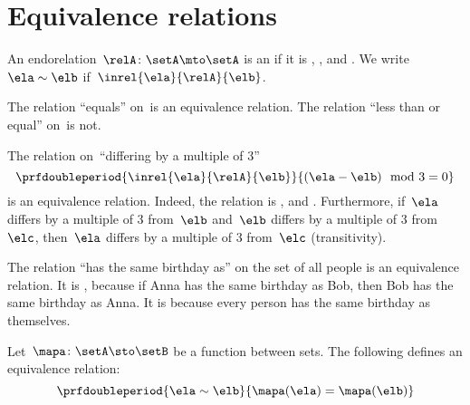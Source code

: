 
\section{Equivalence relations}

\begin{ctdefinition}
    \label{def:equivalence-relation}
    An endorelation~$\relA\colon \setA\mto \setA$ is an \emph{} if it is , , and .
    We write~$\ela\sim \elb$ if~$\inrel{\ela}{\relA}{\elb}$.
\end{ctdefinition}

\begin{example}
    The relation ``equals'' on~\natnumbers  is an equivalence relation.
    The relation ``less than or equal'' on~\natnumbers  is not.
\end{example}

\begin{example}
    The relation on~\natnumbers  ``differing by a multiple of 3''
    \begin{equation}
        \prfdoubleperiod{
            \inrel{\ela}{\relA}{\elb}
        }{
            (\ela-\elb) \mod 3 = 0
        }
    \end{equation}
    is an equivalence relation.
    Indeed, the relation is , and .
    Furthermore, if~$\ela$ differs by a multiple of 3 from~$\elb$ and~$\elb$ differs by a multiple of 3 from~$\elc$, then~$\ela$ differs by a multiple of 3 from~$\elc$ (transitivity).
\end{example}

\begin{example}
    The relation ``has the same birthday as'' on the set of all people is an equivalence relation.
    It is , because if Anna has the same birthday as Bob, then Bob has the same birthday as Anna.
    It is  because every person has the same birthday as themselves.
\end{example}

\begin{example}
    Let~$\mapa\colon \setA \sto \setB$ be a function between sets.
    The following defines an equivalence relation:
    \begin{equation}
        \prfdoubleperiod{
            \ela\sim \elb
        }{
            \mapa(\ela)=\mapa(\elb)
        }
    \end{equation}
\end{example}


